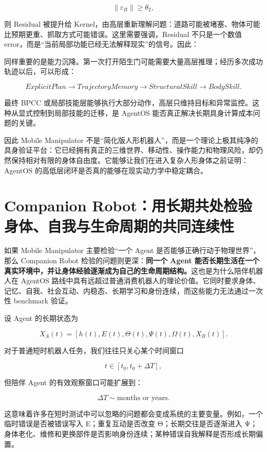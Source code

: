 $$
\|\varepsilon_B\|\geq\theta_2,
$$

则 Residual 被提升给 Kernel，由高层重新理解问题：道路可能被堵塞、物体可能比预期更重、抓取方式可能错误。这里需要强调，Residual 不只是一个数值 error，而是“当前局部功能已经无法解释现实”的信号。因此：

\begin{statementbox}
\centering
{}
\end{statementbox}

同样重要的是能力沉降。第一次打开陌生门可能需要大量高层推理；经历多次成功轨迹以后，可以形成：

$$
ExplicitPlan
\rightarrow
TrajectoryMemory
\rightarrow
StructuralSkill
\rightarrow
BodySkill.
$$

最终 BPCC 或局部技能层能够执行大部分动作，高层只维持目标和异常监控。这种从显式控制到局部技能的迁移，是 AgentOS 能否真正解决长期具身计算成本问题的关键。

因此 Mobile Manipulator 不是“简化版人形机器人”，而是一个理论上极其纯净的具身验证平台：它已经拥有真正的三维世界、移动性、操作能力和物理风险，却仍然保持相对有限的身体自由度。它能够让我们在进入复杂人形身体之前证明：AgentOS 的高低层闭环是否真的能够在现实动力学中稳定耦合。

\section{Companion Robot：用长期共处检验身体、自我与生命周期的共同连续性}

如果 Mobile Manipulator 主要检验“一个 Agent 是否能够正确行动于物理世界”，那么 Companion Robot 检验的问题则更深：\textbf{同一个 Agent 能否长期生活在一个真实环境中，并让身体经验逐渐成为自己的生命周期结构。}这也是为什么陪伴机器人在 AgentOS 路线中具有远超过普通消费机器人的理论价值。它同时要求身体、记忆、自我、社会互动、内稳态、长期学习和身份连续，而这些能力无法通过一次性 benchmark 验证。

设 Agent 的长期状态为

$$
X_A(t)
=
[
h(t),E(t),\Theta(t),\Psi(t),\Omega(t),
X_B(t)
].
$$

对于普通短时机器人任务，我们往往只关心某个时间窗口

$$
t\in[t_0,t_0+\Delta T],
$$

但陪伴 Agent 的有效观察窗口可能扩展到：

$$
\Delta T
\sim
\text{months or years}.
$$

这意味着许多在短时测试中可以忽略的问题都会变成系统的主要变量。例如，一个临时错误是否被错误写入 E；重复互动是否改变 Θ；长期交往是否逐渐进入 Ψ；身体老化、维修和更换部件是否影响身份连续；某种错误自我解释是否形成长期偏置。

